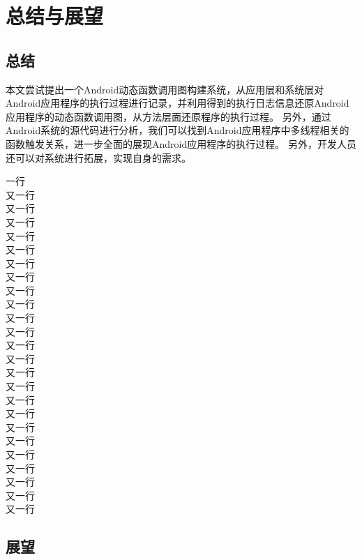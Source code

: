 \chapter{总结与展望}
\label{chp:future}
\section{总结}

本文尝试提出一个Android动态函数调用图构建系统，从应用层和系统层对Android应用程序的执行过程进行记录，并利用得到的执行日志信息还原Android应用程序的动态函数调用图，从方法层面还原程序的执行过程。
另外，通过Android系统的源代码进行分析，我们可以找到Android应用程序中多线程相关的函数触发关系，进一步全面的展现Android应用程序的执行过程。
另外，开发人员还可以对系统进行拓展，实现自身的需求。

一行\\
又一行\\
又一行\\
又一行\\
又一行\\
又一行\\
又一行\\
又一行\\
又一行\\
又一行\\
又一行\\
又一行\\
又一行\\
又一行\\
又一行\\
又一行\\
又一行\\
又一行\\
又一行\\
又一行\\
又一行\\
又一行\\
又一行\\
又一行\\
又一行\\
\section{展望}

